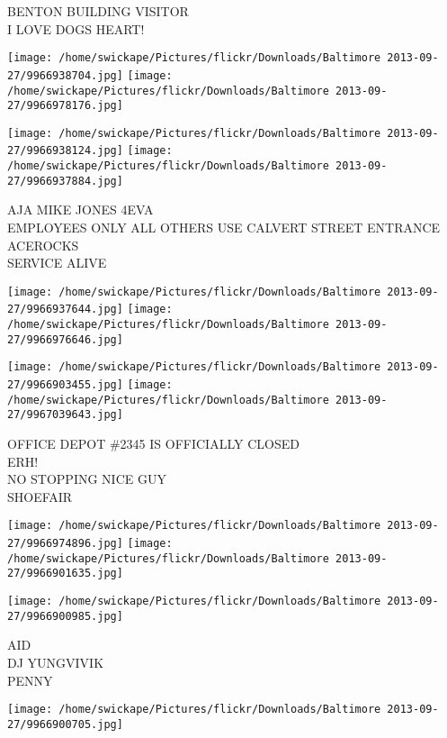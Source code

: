 \documentclass[10pt,letterpaper]{article}
\begin{document}
BENTON BUILDING VISITOR\\
I LOVE DOGS HEART!\\
\pagebreak

\texttt{[image: /home/swickape/Pictures/flickr/Downloads/Baltimore 2013-09-27/9966938704.jpg]}
\texttt{[image: /home/swickape/Pictures/flickr/Downloads/Baltimore 2013-09-27/9966978176.jpg]}

\texttt{[image: /home/swickape/Pictures/flickr/Downloads/Baltimore 2013-09-27/9966938124.jpg]}
\texttt{[image: /home/swickape/Pictures/flickr/Downloads/Baltimore 2013-09-27/9966937884.jpg]}

AJA MIKE JONES 4EVA\\
EMPLOYEES ONLY ALL OTHERS USE CALVERT STREET ENTRANCE\\
ACEROCKS\\
SERVICE ALIVE\\
\pagebreak

\texttt{[image: /home/swickape/Pictures/flickr/Downloads/Baltimore 2013-09-27/9966937644.jpg]}
\texttt{[image: /home/swickape/Pictures/flickr/Downloads/Baltimore 2013-09-27/9966976646.jpg]}

\texttt{[image: /home/swickape/Pictures/flickr/Downloads/Baltimore 2013-09-27/9966903455.jpg]}
\texttt{[image: /home/swickape/Pictures/flickr/Downloads/Baltimore 2013-09-27/9967039643.jpg]}

OFFICE DEPOT \#2345 IS OFFICIALLY CLOSED\\
ERH!\\
NO STOPPING NICE GUY\\
SHOEFAIR\\
\pagebreak

\texttt{[image: /home/swickape/Pictures/flickr/Downloads/Baltimore 2013-09-27/9966974896.jpg]}
\texttt{[image: /home/swickape/Pictures/flickr/Downloads/Baltimore 2013-09-27/9966901635.jpg]}

\texttt{[image: /home/swickape/Pictures/flickr/Downloads/Baltimore 2013-09-27/9966900985.jpg]}

AID\\
DJ YUNGVIVIK\\
PENNY\\
\pagebreak

\texttt{[image: /home/swickape/Pictures/flickr/Downloads/Baltimore 2013-09-27/9966900705.jpg]}
\end{document}
